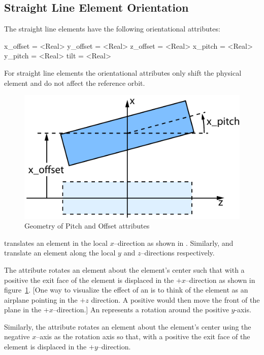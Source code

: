 \subsection{Straight Line Element Orientation}
\label{s:straight.orient}

The straight line elements have the following orientational attributes:
\begin{example}
  x_offset = <Real>
  y_offset = <Real>
  z_offset = <Real>
  x_pitch  = <Real>
  y_pitch  = <Real>
  tilt     = <Real>    
\end{example}
For straight line elements the orientational attributes only shift the
physical element and do not affect the reference orbit.

\begin{figure}[tb]
  \centering
  \includegraphics{pitch.pdf}
  \caption{Geometry of Pitch and Offset attributes}
  \label{f:pitch}
\end{figure}

 translates an element in the local $x$--direction as shown in
. Similarly,  and  translate an element along the local $y$
and $z$--directions respectively.

The  attribute rotates an element about the element's center such that with a positive
 the exit face of the element is displaced in the $+x$--direction as shown in
figure~\ref{f:pitch}. [One way to visualize the effect of an  is to think of the element
as an airplane pointing in the $+z$ direction. A positive  would then move the front of
the plane in the $+x$--direction.] An represents a rotation around the positive
$y$-axis.

Similarly, the  attribute rotates an element about the element's center using the
negative $x$--axis as the rotation axis so that, with a positive  the exit face of the
element is displaced in the $+y$--direction.

